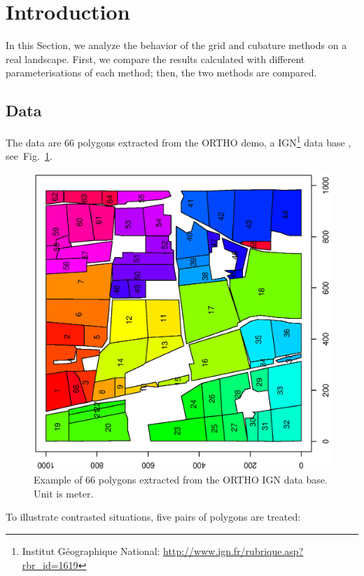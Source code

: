 \label{sec:ex}

\section{Introduction}
In this Section, we analyze the behavior
of the grid and  cubature methods on a real landscape.
First, we compare the results calculated with different 
parameterisations 
of each  method; then,
 the two methods are compared.

\subsection{Data}
The data are 66 polygons extracted from
the ORTHO demo, a IGN\footnote{Institut Géographique National:
  \href{http://www.ign.fr/rubrique.asp?rbr\_id=1619}
{http://www.ign.fr/rubrique.asp?rbr\_id=1619}} data base
, see~Fig.~\ref{fig:parcelle}.
\begin{figure}
  \begin{center}
    \includegraphics[angle=-90, width=15cm]{./VignetteDir/graphics/parcelles.ps}
  \end{center}
\caption{Example of 66  polygons extracted from the ORTHO IGN data base. Unit is meter.}\label{fig:parcelle}
\end{figure}
To illustrate  contrasted situations,
five pairs of polygons are treated:
